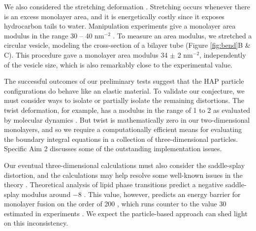 We also considered the stretching deformation \cite{Fu2018_SIAM}. 
Stretching occurs whenever there is an excess monolayer area,
and it is energetically costly since it exposes hydrocarbon tails to water. 
Manipulation experiments give a monolayer area modulus in the range 
30 -- 40 \kBT\; nm$^{-2}$ \cite{Nagle17, Nagle17-2}. 
To measure an area modulus, we stretched a circular vesicle, modeling the cross-section 
of a bilayer tube (Figure \ref{fig:bend}B \& C).
This procedure gave a monolayer area modulus 
34 $\pm$ 2 \kBT \;nm$^{-2}$, independently of the vesicle size, which
is also remarkably close to the experimental value.  

The successful outcomes of our preliminary tests suggest that the HAP particle configurations 
do behave like an elastic material. To validate our conjecture, we must consider 
ways to isolate or partially isolate the remaining distortions. 
The twist deformation, for example, has a modulus in the range of 1 to 2 \kBT\; 
as evaluated by molecular dynamics \cite{LeVeWa14}. 
But twist is mathematically zero in our two-dimensional monolayers,
and so we require a computationally efficient means for evaluating the 
boundary integral equations in a collection of three-dimensional particles. 
Specific Aim 2 discusses some of the outstanding implementation issues. 


Our eventual three-dimensional calculations must also consider the saddle-splay distortion,
and the calculations may help resolve some well-known issues in the theory \cite{TerziDeserno17}. 
Theoretical analysis of lipid phase transitions predict a negative saddle-splay modulus around $-8$ \kBT\;
\cite{SIEGEL2004366,SIEGEL20085200}.
This value, however, 
predicts an energy barrier for monolayer fusion on the order of 200  \kBT, which runs counter to 
the value 30 \kBT\; estimated in experiments \cite{RyKlYaCo16,FrRoPi17,Tran7106}.  
We expect the particle-based approach can shed light on this inconsistency. 



